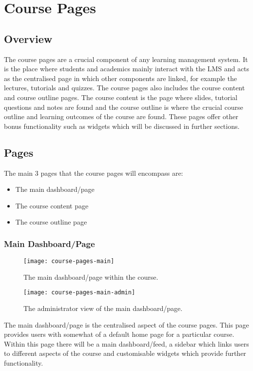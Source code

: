 \section{Course Pages}
\subsection{Overview}
The course pages are a crucial component of any learning management system. It is the place where students and academics mainly interact with the LMS and acts as the centralised page in which other components are linked, for example the lectures, tutorials and quizzes. 
The course pages also includes the course content and course outline pages. The course content is the page where slides, tutorial questions and notes are found and the course outline is where the crucial course outline and learning outcomes of the course are found.
These pages offer other bonus functionality such as widgets which will be discussed in further sections.

\subsection{Pages}
The main 3 pages that the course pages will encompass are:
\begin{itemize}
    \item The main dashboard/page
    \item The course content page
    \item The course outline page
\end{itemize}

\subsubsection{Main Dashboard/Page}
\begin{figure}[h]
    \centering
    \texttt{[image: course-pages-main]}
    \caption{The main dashboard/page within the course.}
\end{figure}
\begin{figure}[h]
    \centering
    \texttt{[image: course-pages-main-admin]}
    \caption{The administrator view of the main dashboard/page.}
\end{figure}
The main dashboard/page is the centralised aspect of the course pages.
This page provides users with somewhat of a default home page for a particular course.
Within this page there will be a main dashboard/feed, a sidebar which links users to different aspects of the course and customisable widgets which provide further functionality. 

